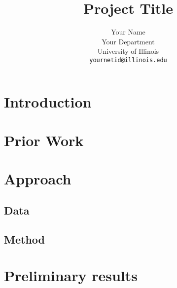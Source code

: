 \documentclass[11pt,a4paper]{article}
\title{Project Title}
\author{Your Name \\
  Your Department \\
  University of Illinois \\
  \texttt{yournetid@illinois.edu}}
\date{}
\begin{document}
\maketitle
\begin{abstract}
\lipsum[1] %
\end{abstract}

\section{Introduction}

\lipsum[2-5] \lipsum[66] %


\section{Prior Work}

\lipsum[6-20] \lipsum[17]  %


\section{Approach}

\lipsum[21]

\subsection{Data}
\lipsum[22-24]

\subsection{Method}
\lipsum[25-28]


\section{Preliminary results}

\lipsum[29-35] \lipsum[66]



\nocite{Europarl} %



\end{document}
